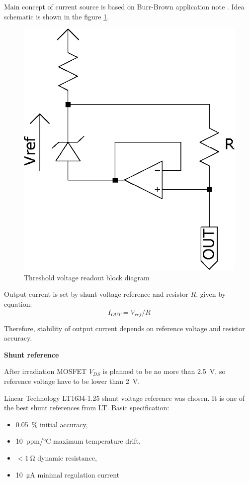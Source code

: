         Main concept of current source is based on Burr-Brown application note \cite{Make_a_precision_current_source_or_sink}. Idea schematic is shown in the figure \ref{current_source_schematic}.

        \begin{figure}[H]
            \centering
            \includegraphics[width=0.3\paperwidth]{img/06/current_source_schematic.eps}
            \caption{Threshold voltage readout block diagram}
            \label{current_source_schematic}
        \end{figure}

        Output current is set by shunt voltage reference and resistor $R$, given by equation:
        $$I_{OUT} = V_{ref}/R$$

        Therefore, stability of output current depends on reference voltage and resistor accuracy.

        \bigskip \textbf{Shunt reference}

        After irradiation MOSFET $V_{DS}$ is planned to be no more than \SI{2.5}{\volt}, so reference voltage have to be lower than \SI{2}{\volt}.

        Linear Technology LT1634-1.25 shunt voltage reference was chosen. It is one of the best shunt references from LT. Basic specification:
        \begin{itemize}
            \item \SI{0.05}{\percent} initial accuracy,
            \item \SI{10}{ppm/\degreeCelsius} maximum temperature drift,
            \item $< \SI{1}{\ohm}$ dynamic resistance,
            \item \SI{10}{\uA} minimal regulation current
        \end{itemize}

